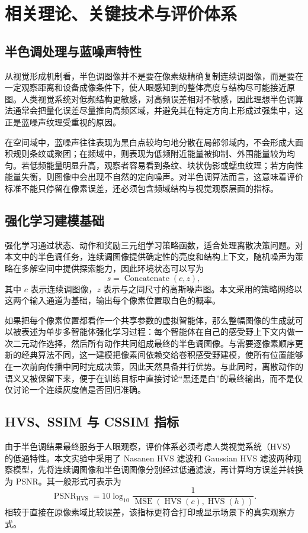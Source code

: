 \documentclass[thesis]{../zstucs-graduation-project}
\begin{document}
\section{相关理论、关键技术与评价体系}

\subsection{半色调处理与蓝噪声特性}
从视觉形成机制看，半色调图像并不是要在像素级精确复制连续调图像，而是要在一定观察距离和设备成像条件下，使人眼感知到的整体亮度与结构尽可能接近原图。人类视觉系统对低频结构更敏感，对高频误差相对不敏感，因此理想半色调算法通常会把量化误差尽量推向高频区域，并避免其在特定方向上形成过强集中，这正是蓝噪声纹理受重视的原因\cite{ULICHNEY1988Dithering}。

在空间域中，蓝噪声往往表现为黑白点较均匀地分散在局部邻域内，不会形成大面积规则条纹或聚团；在频域中，则表现为低频附近能量被抑制、外围能量较为均匀。若低频能量明显升高，观察者容易看到条纹、块状伪影或蠕虫纹理；若方向性能量失衡，则图像中会出现不自然的定向噪声。对半色调算法而言，这意味着评价标准不能只停留在像素误差，还必须包含频域结构与视觉观察层面的指标。

\subsection{强化学习建模基础}
强化学习通过状态、动作和奖励三元组学习策略函数，适合处理离散决策问题。对本文中的半色调任务，连续调图像提供确定性的亮度和结构上下文，随机噪声为策略在多解空间中提供探索能力，因此环境状态可以写为
\begin{equation}
s = \operatorname{Concatenate}(c, z),
\label{eq:2-1}
\end{equation}
其中 $c$ 表示连续调图像，$z$ 表示与之同尺寸的高斯噪声图。本文采用的策略网络以这两个输入通道为基础，输出每个像素位置取白色的概率。

如果把每个像素位置都看作一个共享参数的虚拟智能体，那么整幅图像的生成就可以被表述为单步多智能体强化学习过程：每个智能体在自己的感受野上下文内做一次二元动作选择，然后所有动作共同组成最终的半色调图像。与需要逐像素顺序更新的经典算法不同，这一建模把像素间依赖交给卷积感受野建模，使所有位置能够在一次前向传播中同时完成决策，因此天然具备并行优势。与此同时，离散动作的语义又被保留下来，便于在训练目标中直接讨论“黑还是白”的最终输出，而不是仅仅讨论一个连续灰度值是否回归准确。

\subsection{HVS、SSIM 与 CSSIM 指标}
由于半色调结果最终服务于人眼观察，评价体系必须考虑人类视觉系统（HVS）的低通特性。本文实验中采用了 Nasanen HVS 滤波和 Gaussian HVS 滤波两种观察模型，先将连续调图像和半色调图像分别经过低通滤波，再计算均方误差并转换为 PSNR。其一般形式可表示为
\begin{equation}
\operatorname{PSNR}_{\mathrm{HVS}} = 10\log_{10}\frac{1}{\operatorname{MSE}(\operatorname{HVS}(c),\operatorname{HVS}(h))}.
\label{eq:2-2}
\end{equation}
相较于直接在原像素域比较误差，该指标更符合打印或显示场景下的真实观察方式。
\end{document}
